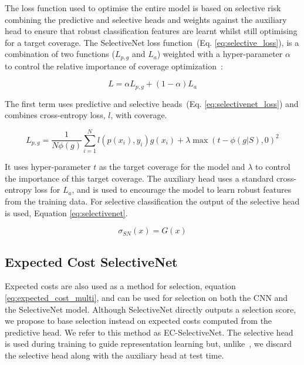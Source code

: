 The loss function used to optimise the entire model is based on selective risk combining the predictive and selective heads and weights against the auxiliary head to ensure that robust classification features are learnt whilst still optimising for a target coverage. The SelectiveNet loss function~(Eq. \ref{eq:selective_loss}), is a combination of two functions (\(L_{p, g}\) and \(L_a\)) weighted with a hyper-parameter \(\alpha\) to control the relative importance of coverage optimization~\cite{Geifman2019}: 

\begin{equation}
	L = \alpha L_{p, g} + (1 - \alpha)L_a
	\label{eq:selective_loss}
\end{equation}

\noindent The first term uses predictive and selective heads~(Eq. \ref{eq:selectivenet_loss}) and combines cross-entropy loss, $l$, with coverage. 

\begin{equation}
	L_{p, g} = \frac{1}{N \phi(g)}\sum^{N}_{i=1}l(p(x_i), y_i) g(x_i) + \lambda\max(t - \phi(g|S), 0)^2
	\label{eq:selectivenet_loss}
\end{equation}

It uses hyper-parameter \(t\) as the target coverage for the model and \(\lambda\) to control the importance of this target coverage. The auxiliary head uses a standard cross-entropy loss for $L_a$, and is used to encourage the model to learn robust features from the training data. For selective classification the output of the selective head is used, Equation \ref{eq:selectivenet}.

\begin{equation}
	\sigma_{SN}(x) = G(x)
	\label{eq:selectivenet}
\end{equation}

\subsection{Expected Cost SelectiveNet}
\label{subsec:ec_selectivenet}
Expected costs are also used as a method for selection, equation \ref{eq:expected_cost_multi}, and can be used for selection on both the CNN and the SelectiveNet model. Although SelectiveNet directly outputs a selection score, we propose to base selection instead on expected costs computed from the predictive head. We refer to this method as EC-SelectiveNet. The selective head is used during training to guide representation learning but, unlike~\cite{Geifman2019Selective}, we discard the selective head along with the auxiliary head at test time.



